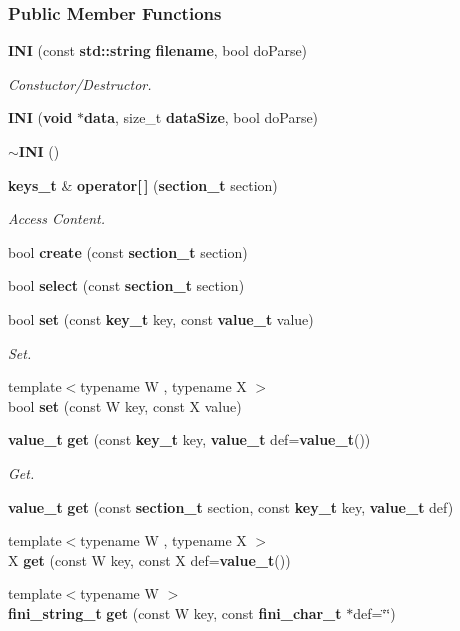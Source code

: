 \subsubsection*{Public Member Functions}
\begin{DoxyCompactItemize}
\item 
{\bf I\+NI} (const {\bf std\+::string} {\bf filename}, bool do\+Parse)
\begin{DoxyCompactList}\small\item\em Constuctor/\+Destructor. \end{DoxyCompactList}\item 
{\bf I\+NI} ({\bf void} $\ast${\bf data}, size\+\_\+t {\bf data\+Size}, bool do\+Parse)
\item 
{\bf $\sim$\+I\+NI} ()
\item 
{\bf keys\+\_\+t} \& {\bf operator[$\,$]} ({\bf section\+\_\+t} section)
\begin{DoxyCompactList}\small\item\em Access Content. \end{DoxyCompactList}\item 
bool {\bf create} (const {\bf section\+\_\+t} section)
\item 
bool {\bf select} (const {\bf section\+\_\+t} section)
\item 
bool {\bf set} (const {\bf key\+\_\+t} key, const {\bf value\+\_\+t} value)
\begin{DoxyCompactList}\small\item\em Set. \end{DoxyCompactList}\item 
{\footnotesize template$<$typename W , typename X $>$ }\\bool {\bf set} (const W key, const X value)
\item 
{\bf value\+\_\+t} {\bf get} (const {\bf key\+\_\+t} key, {\bf value\+\_\+t} def={\bf value\+\_\+t}())
\begin{DoxyCompactList}\small\item\em Get. \end{DoxyCompactList}\item 
{\bf value\+\_\+t} {\bf get} (const {\bf section\+\_\+t} section, const {\bf key\+\_\+t} key, {\bf value\+\_\+t} def)
\item 
{\footnotesize template$<$typename W , typename X $>$ }\\X {\bf get} (const W key, const X def={\bf value\+\_\+t}())
\item 
{\footnotesize template$<$typename W $>$ }\\{\bf fini\+\_\+string\+\_\+t} {\bf get} (const W key, const {\bf fini\+\_\+char\+\_\+t} $\ast$def=\char`\"{}\char`\"{})

\end{DoxyCompactItemize}
